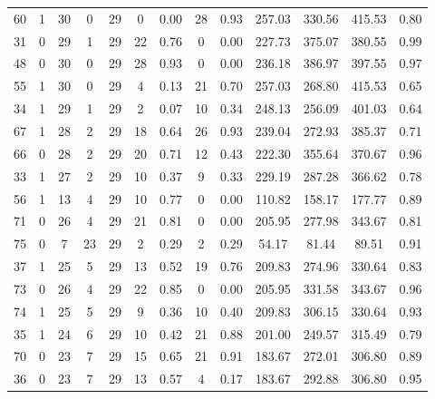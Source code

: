 \documentclass[a4paper,12pt,american]{article}
\theoremstyle{definition}
\begin{document}
\begin{table}[H]
{\begin{tabular}{lcccccccccccc}
	60  &     1 &        30 &      0 &    29 &       0 &    0.00 &     28 &   0.93 &  257.03 &  330.56 &  415.53 &  0.80 \\
	31  &     0 &        29 &      1 &    29 &      22 &    0.76 &      0 &   0.00 &  227.73 &  375.07 &  380.55 &  0.99 \\
	48  &     0 &        30 &      0 &    29 &      28 &    0.93 &      0 &   0.00 &  236.18 &  386.97 &  397.55 &  0.97 \\
	55  &     1 &        30 &      0 &    29 &       4 &    0.13 &     21 &   0.70 &  257.03 &  268.80 &  415.53 &  0.65 \\
	34  &     1 &        29 &      1 &    29 &       2 &    0.07 &     10 &   0.34 &  248.13 &  256.09 &  401.03 &  0.64 \\
	67  &     1 &        28 &      2 &    29 &      18 &    0.64 &     26 &   0.93 &  239.04 &  272.93 &  385.37 &  0.71 \\
	66  &     0 &        28 &      2 &    29 &      20 &    0.71 &     12 &   0.43 &  222.30 &  355.64 &  370.67 &  0.96 \\
	33  &     1 &        27 &      2 &    29 &      10 &    0.37 &      9 &   0.33 &  229.19 &  287.28 &  366.62 &  0.78 \\
	56  &     1 &        13 &      4 &    29 &      10 &    0.77 &      0 &   0.00 &  110.82 &  158.17 &  177.77 &  0.89 \\
	71  &     0 &        26 &      4 &    29 &      21 &    0.81 &      0 &   0.00 &  205.95 &  277.98 &  343.67 &  0.81 \\
	75  &     0 &         7 &     23 &    29 &       2 &    0.29 &      2 &   0.29 &   54.17 &   81.44 &   89.51 &  0.91 \\
	37  &     1 &        25 &      5 &    29 &      13 &    0.52 &     19 &   0.76 &  209.83 &  274.96 &  330.64 &  0.83 \\
	73  &     0 &        26 &      4 &    29 &      22 &    0.85 &      0 &   0.00 &  205.95 &  331.58 &  343.67 &  0.96 \\
	74  &     1 &        25 &      5 &    29 &       9 &    0.36 &     10 &   0.40 &  209.83 &  306.15 &  330.64 &  0.93 \\
	35  &     1 &        24 &      6 &    29 &      10 &    0.42 &     21 &   0.88 &  201.00 &  249.57 &  315.49 &  0.79 \\
	70  &     0 &        23 &      7 &    29 &      15 &    0.65 &     21 &   0.91 &  183.67 &  272.01 &  306.80 &  0.89 \\
	36  &     0 &        23 &      7 &    29 &      13 &    0.57 &      4 &   0.17 &  183.67 &  292.88 &  306.80 &  0.95 \\

\end{tabular}}
\end{table}
\end{document}
